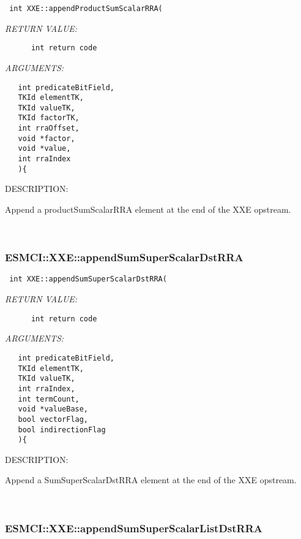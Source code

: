   
\begin{verbatim} int XXE::appendProductSumScalarRRA(\end{verbatim}{\em RETURN VALUE:}
\begin{verbatim}      int return code\end{verbatim}{\em ARGUMENTS:}
\begin{verbatim}   int predicateBitField,
   TKId elementTK,
   TKId valueTK,
   TKId factorTK,
   int rraOffset,
   void *factor,
   void *value,
   int rraIndex
   ){\end{verbatim}
{\sf DESCRIPTION:\\ }


    Append a productSumScalarRRA element at the end of the XXE opstream. 
 
\mbox{}\hrulefill\
 
\subsubsection [ESMCI::XXE::appendSumSuperScalarDstRRA] {ESMCI::XXE::appendSumSuperScalarDstRRA}


  
\begin{verbatim} int XXE::appendSumSuperScalarDstRRA(\end{verbatim}{\em RETURN VALUE:}
\begin{verbatim}      int return code\end{verbatim}{\em ARGUMENTS:}
\begin{verbatim}   int predicateBitField,
   TKId elementTK,
   TKId valueTK,
   int rraIndex,
   int termCount,
   void *valueBase,
   bool vectorFlag,
   bool indirectionFlag
   ){\end{verbatim}
{\sf DESCRIPTION:\\ }


    Append a SumSuperScalarDstRRA element at the end of the XXE opstream. 
 
\mbox{}\hrulefill\
 
\subsubsection [ESMCI::XXE::appendSumSuperScalarListDstRRA] {ESMCI::XXE::appendSumSuperScalarListDstRRA}


